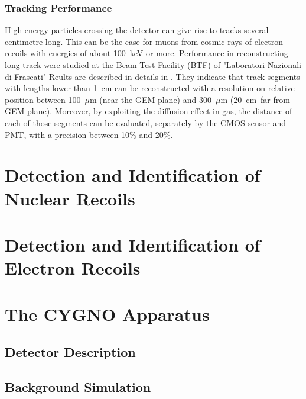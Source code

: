 \documentclass[review]{elsarticle}
\begin{document}
\subsubsection{Tracking Performance}

High energy particles crossing the detector can give rise to tracks several
centimetre long.
This can be the case for muons from cosmic rays of electron recoils with energies of about 100~keV or more. 
Performance in reconstructing long track were studied at the Beam Test Facility (BTF) of "Laboratori Nazionali di Frascati" \cite{bib:btf1,bib:btf2}
Reults are described in details in \cite{bib:ieee17, bib:ieee18, bib:lemon_btf}. They indicate that track segments with lengths lower than 1~cm can be reconstructed with a resolution on relative position between 100~$\mu$m (near the GEM plane) and 300~$\mu$m (20~cm~far from GEM plane).
Moreover, by exploiting the diffusion effect in gas, the distance of each of those segments can be evaluated, separately by the CMOS sensor and PMT, with a precision between 10\% and 20\%.

\section{Detection and Identification of Nuclear Recoils}



\section{Detection and Identification of Electron Recoils}

\section{The CYGNO Apparatus}

\subsection{Detector Description}
\subsection{Background Simulation}
\end{document}
